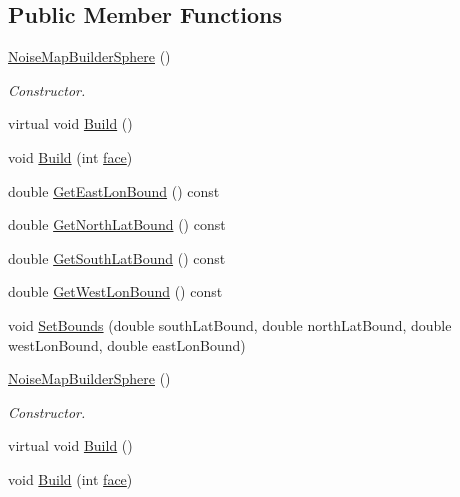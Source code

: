 \subsection*{Public Member Functions}
\begin{DoxyCompactItemize}
\item 
\hyperlink{classnoise_1_1utils_1_1_noise_map_builder_sphere_ad18bcd94de3b6e9a68c40fbfb0349dfe}{Noise\+Map\+Builder\+Sphere} ()
\begin{DoxyCompactList}\small\item\em Constructor. \end{DoxyCompactList}\item 
virtual void \hyperlink{classnoise_1_1utils_1_1_noise_map_builder_sphere_a39ac9c3dba8db40b6d5d34c2ec54704b}{Build} ()
\item 
void \hyperlink{classnoise_1_1utils_1_1_noise_map_builder_sphere_afe9540eaca869ad246945aa378b7aa5d}{Build} (int \hyperlink{_planet_8cpp_ae1161f79bdbe47164b23549af2139d25}{face})
\item 
double \hyperlink{classnoise_1_1utils_1_1_noise_map_builder_sphere_a147b825ed70509ae4915cf58dcbc5849}{Get\+East\+Lon\+Bound} () const 
\item 
double \hyperlink{classnoise_1_1utils_1_1_noise_map_builder_sphere_a3a57e009f39f48a464ea0edc2beb4241}{Get\+North\+Lat\+Bound} () const 
\item 
double \hyperlink{classnoise_1_1utils_1_1_noise_map_builder_sphere_a8a4c78a1a4d6b659e721fabdf3f5f47f}{Get\+South\+Lat\+Bound} () const 
\item 
double \hyperlink{classnoise_1_1utils_1_1_noise_map_builder_sphere_aef51b39b7fbd0a010e17e47bff877ae1}{Get\+West\+Lon\+Bound} () const 
\item 
void \hyperlink{classnoise_1_1utils_1_1_noise_map_builder_sphere_ad2f19622ba12bc8ee715b2d070bfaf09}{Set\+Bounds} (double south\+Lat\+Bound, double north\+Lat\+Bound, double west\+Lon\+Bound, double east\+Lon\+Bound)
\item 
\hyperlink{classnoise_1_1utils_1_1_noise_map_builder_sphere_af11f66fdc2c0c68624bc18108548ada7}{Noise\+Map\+Builder\+Sphere} ()
\begin{DoxyCompactList}\small\item\em Constructor. \end{DoxyCompactList}\item 
virtual void \hyperlink{classnoise_1_1utils_1_1_noise_map_builder_sphere_a3596d6c68110cfaa10b6624a5670db70}{Build} ()
\item 
void \hyperlink{classnoise_1_1utils_1_1_noise_map_builder_sphere_a5de6eff940f65bcca84683058641f0fd}{Build} (int \hyperlink{_planet_8cpp_ae1161f79bdbe47164b23549af2139d25}{face})

\end{DoxyCompactItemize}
